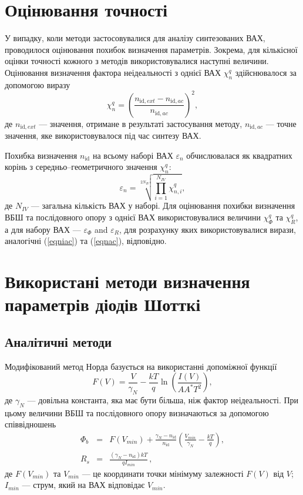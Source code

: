 \section{Оцінювання точності}
У випадку, коли методи застосовувалися для аналізу синтезованих ВАХ, проводилося оцінювання похибок визначення параметрів.
Зокрема, для кількісної оцінки точності кожного з методів використовувалися наступні величини.
Оцінювання визначення фактора неідеальності з однієї ВАХ $\chi^q_n$ здійснювалося за допомогою виразу
\begin{equation}
\label{eqniac}
\chi^q_n=\left(\frac{n_{\mathrm{id},ext}-n_{\mathrm{id},ac}}{n_{\mathrm{id},ac}}\right)^2,
\end{equation}
де
$n_{\mathrm{id},ext}$ --- значення, отримане в результаті застосування методу,
$n_{\mathrm{id},ac}$ --- точне значення, яке використовувалося під час синтезу ВАХ.


Похибка визначення $n_\mathrm{id}$ на всьому наборі ВАХ $\varepsilon_n$ обчислювалася  як квадратних корінь з середньо--геометричного значення $\chi^q_n$:
\begin{equation}
\label{eqnac}
\varepsilon_n=\sqrt[2N_{I\!V}]{\prod_{i=1}^{N_{I\!V}}\chi^q_{n,i}},
\end{equation}
де
$N_{I\!V}$ --- загальна кількість ВАХ у наборі.
Для оцінювання похибки визначення ВБШ та послідовного опору з однієї ВАХ використовувалися величини  $\chi^q_\Phi$ та $\chi^q_R$, а для набору ВАХ --- $\varepsilon_\Phi$ and $\varepsilon_R$, для розрахунку яких використовувалися вирази, аналогічні (\ref{eqniac}) та (\ref{eqnac}), відповідно.

\section{Використані методи визначення параметрів діодів Шотткі}
\subsection{Аналітичні методи\label{AnMethod}}
Модифікований метод Норда \cite{Norde,Lien,Sato,Dermircioglu:Norde} базується на використанні допоміжної функції
\begin{equation}
\label{eqNorde}
F(V)=\frac{V}{\gamma_N}-\frac{kT}{q}\ln\left(\frac{I(V)}{AA^*T^2}\right),
\end{equation}
де
$\gamma_N$ --- довільна константа, яка має бути більша, ніж фактор неідеальності.
При цьому величини ВБШ та послідовного опору визначаються за допомогою співвідношень
\begin{eqnarray}
\label{eqNordDet}
\Phi_b&=&F(V_{min})+\frac{\gamma_N-n_\mathrm{id}}{n_\mathrm{id}}\left(\frac{V_{min}}{\gamma_N}-\frac{kT}{q}\right),
\\
R_s&=&\frac{(\gamma_N-n_\mathrm{id})kT}{qI_{min}}\,,
\end{eqnarray}
де
$F(V_{min})$ та $V_{min}$ --- це координати точки мінімуму залежності $F(V)$ від $V$;
$I_{min}$  --- струм, який на ВАХ відповідає $V_{min}$.


